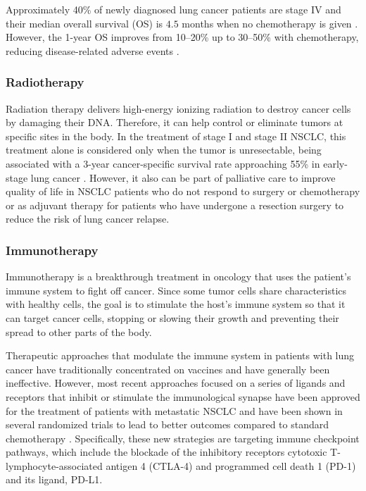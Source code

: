 Approximately 40\% of newly diagnosed lung cancer patients are stage IV and their median overall survival (OS) is $4.5$ months when no chemotherapy is given \cite{TNM}. However, the 1-year OS improves from 10–20\% up to 30–50\%  with chemotherapy, reducing disease-related adverse events \cite{EGFR_mutations}.

\subsubsection{Radiotherapy}

Radiation therapy delivers high-energy ionizing radiation to destroy cancer cells by damaging their DNA. Therefore, it can help control or eliminate tumors at specific sites in the body. In the treatment of stage I and stage II NSCLC, this treatment alone is considered only when the tumor is unresectable, being associated with a 3-year cancer-specific survival rate approaching 55\% in early-stage lung cancer \cite{Radio}. However, it also can be part of palliative care to improve quality of life in NSCLC patients who do not respond to surgery or chemotherapy or as adjuvant therapy for patients who have undergone a resection surgery to reduce the risk of lung cancer relapse.

\subsubsection{Immunotherapy}

Immunotherapy is a breakthrough treatment in oncology that uses the patient's immune system to fight off cancer. Since some tumor cells share characteristics with healthy cells, the goal is to stimulate the host's immune system so that it can target cancer cells, stopping or slowing their growth and preventing their spread to other parts of the body. 

Therapeutic approaches that modulate the immune system in patients with lung cancer have traditionally concentrated on vaccines and have generally been ineffective. However, most recent approaches focused on a series of ligands and receptors that inhibit or stimulate the immunological synapse have been approved for the treatment of patients with metastatic NSCLC and have been shown in several randomized trials to lead to better outcomes compared to standard chemotherapy \cite{Immuno}. Specifically, these new strategies are targeting immune checkpoint pathways, which include the blockade of the inhibitory receptors cytotoxic T-lymphocyte-associated antigen 4 (CTLA-4) and programmed cell death 1 (PD-1) and its ligand, PD-L1.


